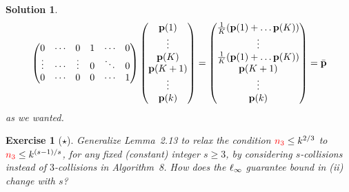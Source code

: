 \documentclass[biber]{nowfnt} %
\newtheorem{question}{Exercise}[chapter]
\newtheorem{solution}{Solution}[chapter]
\newcommand{\nsu}{\textcolor{red}{\ns_3}}
\newcommand{\nsu}{\ns_3}
\begin{document}
\begin{solution}
\[\begin{pmatrix}
	0 & \cdots & 0 & 1 &\cdots & 0\\
	\vdots & \cdots & \vdots & 0 &\ddots & 0\\
	0 & \cdots & 0 & 0 &\cdots & 1\\
	\end{pmatrix} 
	\begin{pmatrix}
	\p(1)\\
	\vdots \\
	\p(K)\\
	\p(K+1)\\
	\vdots\\
	\p(\ab)
	\end{pmatrix} 
	= \begin{pmatrix}
	\frac{1}{K}(\p(1)+\dots \p(K))\\
	\vdots \\
	\frac{1}{K}(\p(1)+\dots \p(K))\\
	\p(K+1)\\
	\vdots\\
	\p(\ab)
	\end{pmatrix} 
	= \bar{\p}
\]
as we wanted.
\end{solution}
\begin{question}[$\star$]\label{ex:linftycheck}
  Generalize Lemma~2.13 to relax the condition $\nsu \leq \ab^{2/3}$ to $\nsu \leq \ab^{(s-1)/s}$, for any fixed (constant) integer $s\geq 3$, by considering $s$-collisions instead of $3$-collisions in Algorithm~8. How does the $\lp[\infty]$ guarantee bound in (ii) change with $s$?
\end{question}
\end{document}

